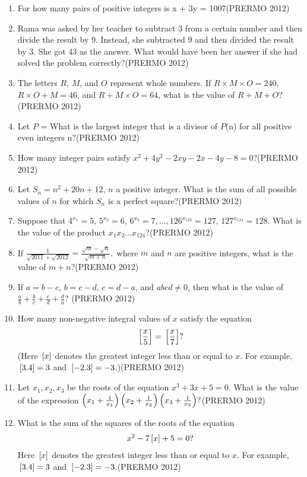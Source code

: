 \begin{enumerate}
\item For how many pairs of positive integers  is x + 3y = 1007\hfill(PRERMO 2012)
\item Rama was asked by her teacher to subtract 3 from a certain number and then divide the result by 9. Instead, she subtracted 9 and then divided the result by 3. She got 43 as the answer. What would have been her answer if she had solved the problem correctly?\hfill(PRERMO 2012)
\item The letters $R$, $M$, and $O$ represent whole numbers. If $R \times M \times O = 240$, $R \times O + M = 46$, and $R + M \times O = 64$, what is the value of $R + M + O$?\hfill(PRERMO 2012)
\item Let $P$ =  What is the largest integer that is a divisor of $P$(n) for all positive even integers n?\hfill(PRERMO 2012)
\item How many integer pairs  satisfy $ x ^ 2 + 4y ^ 2 - 2xy - 2x - 4y - 8 =0 $?\hfill(PRERMO 2012)
\item Let $S_n = n^2 + 20n + 12$, $n$ a positive integer. What is the sum of all possible values of $n$ for which $S_n$ is a perfect square?\hfill(PRERMO 2012)
\item Suppose that $4^{x_1} = 5$, $5^{x_2} = 6$, $6^{x_3} = 7, \ldots, 126^{x_{123}} = 127$, $127^{x_{124}} = 128$. What is the value of the product $x_1 x_2 \ldots x_{124}$?\hfill(PRERMO 2012)
\item If
	$\frac{1}{\sqrt{2011} + \sqrt{2012}} = \frac{\sqrt{m} - \sqrt{n}}{\sqrt{m+n}},$
where $m$ and $n$ are positive integers, what is the value of $m + n$?\hfill(PRERMO 2012)
\item If $a = b - c$, $b = c - d$, $c = d - a$, and $abcd \neq 0$, then what is the value of $\frac{a}{b} + \frac{b}{c} + \frac{c}{d} + \frac{d}{a}$? \hfill(PRERMO 2012)
\item How many non-negative integral values of $x$ satisfy the equation
	\begin{align}
    {}\left[\frac{x}{5}\right] = {}\left[\frac{x}{7}\right]?
	\end{align}
    (Here ${}\left[x\right]$ denotes the greatest integer less than or equal to $x$. For example, ${}\left[3.4\right] = 3$ and ${}\left[-2.3\right] = -3$.)\hfill(PRERMO 2012)
\item Let $x_1, x_2, x_3$ be the roots of the equation $x^3 + 3x + 5 = 0$. What is the value of the expression $ \left( x_1 + \frac{1}{x_1} \right) \left( x_2 + \frac{1}{x_2} \right)\left( x_3 + \frac{1}{x_3}\right)? $\hfill(PRERMO 2012)
\item What is the sum of the squares of the roots of the equation
	\begin{align}
	x^2 - 7{}\left[x\right] + 5 = 0?
\end{align}
Here ${}\left[x\right]$ denotes the greatest integer less than or equal to $x$. For example, ${}\left[3.4\right] = 3$ and ${}\left[ -2.3\right] = -3$.\hfill(PRERMO 2012)
\end{enumerate}
